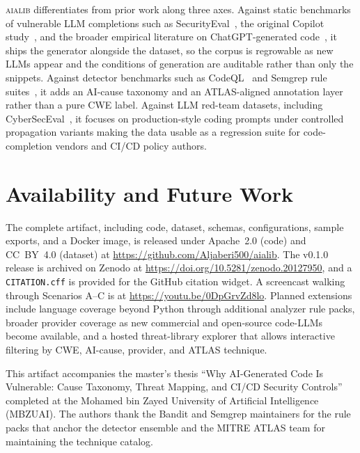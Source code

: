 \documentclass[sigconf,review,anonymous=false]{acmart}
\begin{document}
\textsc{aialib} differentiates from prior work along three axes.
Against static benchmarks of vulnerable LLM completions such as
SecurityEval~\cite{siddiq2022securityeval}, the original Copilot
study~\cite{pearce2022asleep}, and the broader empirical literature
on ChatGPT-generated code~\cite{khoury2023copilot}, it ships the
generator alongside the dataset, so the corpus is regrowable as new
LLMs appear and the conditions of generation are auditable rather
than only the snippets. Against detector benchmarks such as
CodeQL~\cite{codeql} and Semgrep rule
suites~\cite{semgrep,bandit}, it adds an AI-cause taxonomy and an
ATLAS-aligned annotation layer rather than a pure CWE label. Against
LLM red-team datasets, including
CyberSecEval~\cite{bhattcybersec2024}, it focuses on production-style
coding prompts under controlled propagation variants making the data usable as a regression
suite for code-completion vendors and CI/CD policy authors.

\section{Availability and Future Work}

The complete artifact, including code, dataset, schemas, configurations,
sample exports, and a Docker image, is released under Apache~2.0
(code) and CC~BY~4.0 (dataset) at
\url{https://github.com/Aljaberi500/aialib}. The v0.1.0 release is
archived on Zenodo at
\url{https://doi.org/10.5281/zenodo.20127950}, and a
\texttt{CITATION.cff} is provided for the GitHub citation widget. A screencast walking through Scenarios A--C is at
\url{https://youtu.be/0DpGrvZd8lo}. Planned extensions include
language coverage beyond Python through additional analyzer rule
packs, broader provider coverage as new commercial and open-source
code-LLMs become available, and a hosted threat-library explorer that
allows interactive filtering by CWE, AI-cause, provider, and ATLAS
technique. 

\begin{acks}
This artifact accompanies the master's thesis ``Why AI-Generated Code
Is Vulnerable: Cause Taxonomy, Threat Mapping, and CI/CD Security
Controls'' completed at the Mohamed bin Zayed University of
Artificial Intelligence (MBZUAI). The authors thank the Bandit and
Semgrep maintainers for the rule packs that anchor the detector
ensemble and the MITRE ATLAS team for maintaining the technique
catalog.
\end{acks}



\end{document}
